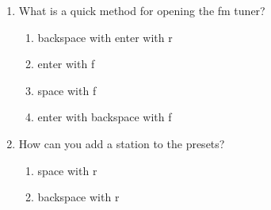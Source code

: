 \documentclass[10pt,letterpaper,twoside]{report}
\begin{document}
{{{{\begin{enumerate}
	      
	      
	      
	      
	      \clearpage
	      
	      \newpage
	      Lesson 29
	      
	      Quiz
	      
	      
	      
	      Write or say the letter of the best answer. Quiz items may be taken from this lesson or prior lessons.
	      
	      
	      
	      \begin{enumerate}
		      \item In the fm tuner, what will enter with dots1 3 do?
		            
		      \item turn the volume up
		            
		      \item turn the volume down
		            
		      \item find a new preset station
		            
		      \item turn the radio off
	      \end{enumerate}
	      
	\item What is a quick method for opening the fm tuner?
	      
	      \begin{enumerate}
		      \item backspace with enter with r
		            
		      \item enter with f
		            
		      \item space with f
		            
		      \item enter with backspace with f
		            
		            
	      \end{enumerate}
	\item How can you add a station to the presets?
	      
	      \begin{enumerate}
		      \item space with r
		            
		      \item backspace with r
		            

\end{enumerate}
\end{enumerate}}}}}
\end{document}
